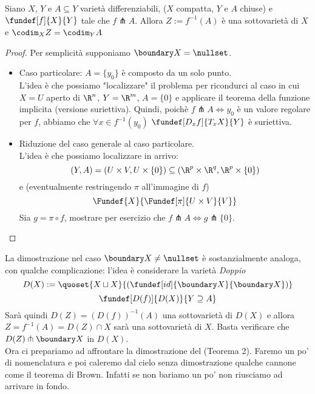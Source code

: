 

\begin{teo}
Siano $X$, $Y$ e $A\subseteq Y$ varietà differenziabili, ($X$ compatta, $Y$ e $A$ chiuse) e $\fundef[f]{X}{Y}$  tale che $f\pitchfork A$. Allora $Z := f^{-1}(A)$ è una sottovarietà di $X$ e $\codim_X{Z} = \codim_Y{A}$
\end{teo}

\begin{proof}
Per semplicità supponiamo $\boundary X = \nullset$.\\
\begin{itemize}
\item Caso particolare: $A = \{ y_0 \}$ è composto da un solo punto. \\
L'idea è che possiamo "localizzare" il problema per ricondurci al caso in cui $X = U$ aperto di $\R^n$, $Y = \R^m$, $A = \{ 0 \}$ e applicare il teorema della funzione implicita (versione suriettiva). Quindi, poichè $f\pitchfork A \iff y_0$ è un valore regolare per $f$, abbiamo che $\forall x \in f^{-1}(y_0)$  $\fundef[D_xf]{T_xX}{Y}$ è suriettiva.
\item Riduzione del caso generale al caso particolare.\\
L'idea è che possiamo localizzare in arrivo: $$(Y,A) = (U \times V, U \times \{ 0 \}) \subseteq (\R^p \times \R^q, \R^p \times \{ 0 \})$$
e (eventualmente restringendo $\pi$ all'immagine di $f$)
$$ \Fundef{X}{\Fundef[\pi]{U \times V}{V}}$$ 
Sia $g = \pi \circ f$, mostrare per esercizio che $f \pitchfork A \iff g \pitchfork \{ 0 \}$.
\end{itemize}
\end{proof}

La dimostrazione nel caso $\boundary X \neq \nullset$ è sostanzialmente analoga, con qualche complicazione: l'idea è considerare la varietà \emph{Doppio}
$$D(X) := \quoset{X \sqcup X}{(\fundef[id]{\boundary X}{\boundary X})}$$ 
$$\fundef[D(f)]{D(X)}{Y \supseteq A}$$
Sarà quindi $D(Z) = (D(f))^{-1}(A)$ una sottovarietà di $D(X)$ e allora $Z = f^{-1}(A) = D(Z) \cap X$ sarà una sottovarietà di $X$. Basta verificare che $D(Z) \pitchfork \boundary X$ in $D(X)$.\\

Ora ci prepariamo ad affrontare la dimostrazione del (Teorema 2). Faremo un po' di nomenclatura e poi caleremo dal cielo senza dimostrazione qualche cannone come il teorema di Brown. Infatti se non bariamo un po' non riusciamo ad arrivare in fondo.

